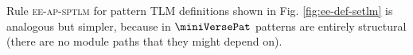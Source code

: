 \documentclass[acmsmall]{acmart}
\begin{document}
Rule \textsc{ee-ap-sptlm} for pattern TLM definitions shown in Fig. \ref{fig:ee-def-setlm} is analogous but simpler, because in $\miniVersePat$ patterns are entirely structural (there are no module paths that they might depend on). %

\end{document}
